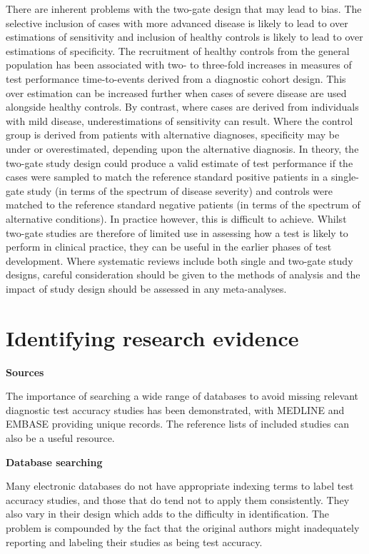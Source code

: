 \documentclass[
  10pt,
  a4paper,
  DIV=11,
  numbers=noendperiod]{scrreprt}
\begin{document}
There are inherent problems with the two-gate design that may lead to
bias. The selective inclusion of cases with more advanced disease is
likely to lead to over estimations of sensitivity and inclusion of
healthy controls is likely to lead to over estimations of specificity.
The recruitment of healthy controls from the general population has been
associated with two- to three-fold increases in measures of test
performance time-to-events derived from a diagnostic cohort design. This
over estimation can be increased further when cases of severe disease
are used alongside healthy controls. By contrast, where cases are
derived from individuals with mild disease, underestimations of
sensitivity can result. Where the control group is derived from patients
with alternative diagnoses, specificity may be under or overestimated,
depending upon the alternative diagnosis. In theory, the two-gate study
design could produce a valid estimate of test performance if the cases
were sampled to match the reference standard positive patients in a
single-gate study (in terms of the spectrum of disease severity) and
controls were matched to the reference standard negative patients (in
terms of the spectrum of alternative conditions). In practice however,
this is difficult to achieve. Whilst two-gate studies are therefore of
limited use in assessing how a test is likely to perform in clinical
practice, they can be useful in the earlier phases of test development.
Where systematic reviews include both single and two-gate study designs,
careful consideration should be given to the methods of analysis and the
impact of study design should be assessed in any meta-analyses.

\section{Identifying research
evidence}\label{identifying-research-evidence-1}

\textbf{Sources}

The importance of searching a wide range of databases to avoid missing
relevant diagnostic test accuracy studies has been demonstrated, with
MEDLINE and EMBASE providing unique records. The reference lists of
included studies can also be a useful resource.

\textbf{Database searching}

Many electronic databases do not have appropriate indexing terms to
label test accuracy studies, and those that do tend not to apply them
consistently. They also vary in their design which adds to the
difficulty in identification. The problem is compounded by the fact that
the original authors might inadequately reporting and labeling their
studies as being test accuracy.
\end{document}
